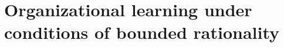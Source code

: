 \documentclass[12pt, man, natbib]{apa6}
\begin{document}
	\section{Organizational learning under conditions of bounded rationality}
	
	
	

%	
%	
	
	


\end{document}
